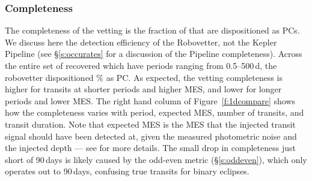 \subsubsection{Completeness}
The completeness of the vetting is the fraction of  that are dispositioned as PCs. We discuss here the detection efficiency of the Robovetter, not the Kepler Pipeline (see \S\ref{s:occurates} for a discussion of the Pipeline completeness). Across the entire set of recovered  which have periods ranging from 0.5--500\,d, the robovetter dispositioned \completeness{}\% as PC. As expected, the vetting completeness is higher for transits at shorter periods and higher MES, and lower for longer periods and lower MES. The right hand column of Figure~\ref{f:1dcompare} shows how the completeness varies with period, expected MES, number of transits, and transit duration. Note that expected MES is the MES that the injected transit signal should have been detected at, given the measured photometric noise and the injected depth --- see \citealt{Christiansen2017} for more details. The small drop in completeness just short of 90\,days is likely caused by the odd-even metric (\S\ref{s:oddeven}), which only operates out to 90\,days, confusing true transits for binary eclipses.  


